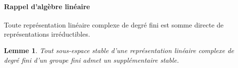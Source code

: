 \documentclass[french]{article}
\newtheorem*{lemma}{Lemme}
\begin{document}
\paragraph{Rappel d'algèbre linéaire}


\begin{thm}[De Maschke]
  Toute représentation linéaire complexe de degré fini est somme directe de représentations irréductibles.
\end{thm}

\begin{lemma}
  Tout sous-espace stable d'une représentation linéaire complexe de degré fini d'un groupe fini admet un supplémentaire stable.
\end{lemma}
\end{document}
